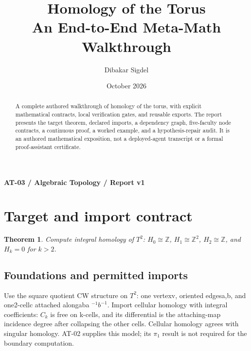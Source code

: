 \documentclass[preprint,12pt,aps,pra,showkeys,amsmath,amssymb,superscriptaddress,floatfix]{revtex4-2}
\newtheorem{theorem}{Theorem}[section]
\theoremstyle{definition}
\theoremstyle{remark}
\begin{document}
\title{Homology of the Torus\\[4pt]\large An End-to-End Meta-Math Walkthrough}

\author{Dibakar Sigdel}


\date{October 2026}

\begin{abstract}

A complete authored walkthrough of homology of the torus, with explicit
mathematical contracts, local verification gates, and reusable exports.
The report presents the target theorem, declared imports, a dependency
graph, five-faculty node contracts, a continuous proof, a worked
example, and a hypothesis-repair audit. It is an authored mathematical
exposition, not a deployed-agent transcript or a formal proof-assistant
certificate.

\end{abstract}\maketitle\linespread{1.12}\selectfont

\noindent\textbf{AT-03 / Algebraic Topology / Report v1}

\section{Target and import contract}

\begin{theorem}

Compute integral homology of \(T^2\): \(H_0\cong\mathbb Z\),
\(H_1\cong\mathbb Z^2\), \(H_2\cong\mathbb Z\), and \(H_k=0\) for
\(k>2\).

\end{theorem}

\subsection{Foundations and permitted imports}

Use the square quotient CW structure on \(T^{2}\): one vertexv, oriented
edgesa,b, and one2-cellc attached alongaba \(^{-1}b^{-1}\). Import
cellular homology with integral coefficients: \(C_k\) is free on
k-cells, and its differential is the attaching-map incidence degree
after collapsing the other cells. Cellular homology agrees with singular
homology. AT-02 supplies this model; its \(\pi _{1}\) result is not
required for the boundary computation.
\end{document}
